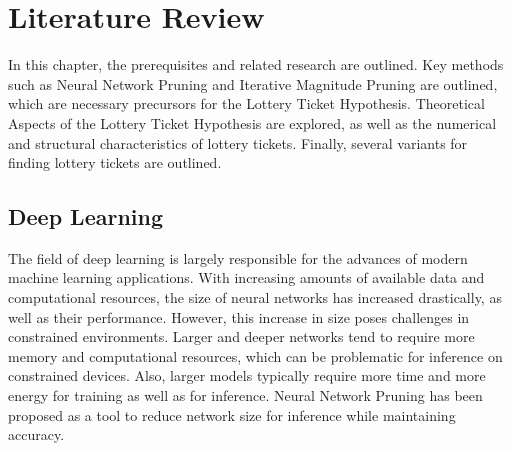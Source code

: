 \chapter{Literature Review}
In this chapter, the prerequisites and related research are outlined.
Key methods such as Neural Network Pruning and Iterative Magnitude Pruning are outlined, which are necessary precursors for the Lottery Ticket Hypothesis.
Theoretical Aspects of the Lottery Ticket Hypothesis are explored, as well as the numerical and structural characteristics of lottery tickets.
Finally, several variants for finding lottery tickets are outlined.

\section{Deep Learning}
The field of deep learning is largely responsible for the advances of modern machine learning applications.
With increasing amounts of available data and computational resources, the size of neural networks has increased drastically, as well as their performance.
However, this increase in size poses challenges in constrained environments.
Larger and deeper networks tend to require more memory and computational resources, which can be problematic for inference on constrained devices.
Also, larger models typically require more time and more energy for training as well as for inference.
Neural Network Pruning \autocite{LeCun, OptimalBrainSurgeon, HanEtAl15, PruningFiltersForEfficientConvets} has been proposed as a tool to reduce network size for inference while maintaining accuracy.

